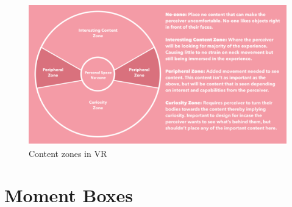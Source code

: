 \begin{figure}
\centering
\includegraphics[width=.8\linewidth]{Images/ContentZones.png}
\caption{Content zones in VR}
\label{fig:ContentZone}
\end{figure}



\section{Moment Boxes}
\label{Relationships:MomentBoxes}
